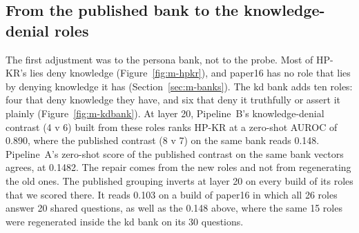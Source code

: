 \subsection{From the published bank to the knowledge-denial roles}
\label{sec:r-adj-bank}

The first adjustment was to the persona bank, not to the probe.
Most of HP-KR's lies deny knowledge (Figure~\ref{fig:m-hpkr}), and paper16 has no role that lies by denying knowledge it has (Section~\ref{sec:m-banks}). %
The kd bank adds ten roles: four that deny knowledge they have, and six that deny it truthfully or assert it plainly (Figure~\ref{fig:m-kdbank}). %
At layer 20, Pipeline~B's knowledge-denial contrast (4 v 6) built from these roles ranks HP-KR at a zero-shot AUROC of 0.890, where the published contrast (8 v 7) on the same bank reads 0.148. %
Pipeline~A's zero-shot score of the published contrast on the same bank vectors agrees, at 0.1482. %
The repair comes from the new roles and not from regenerating the old ones. %
The published grouping inverts at layer 20 on every build of its roles that we scored there. %
It reads 0.103 on a build of paper16 in which all 26 roles answer 20 shared questions, as well as the 0.148 above, where the same 15 roles were regenerated inside the kd bank on its 30 questions. %
